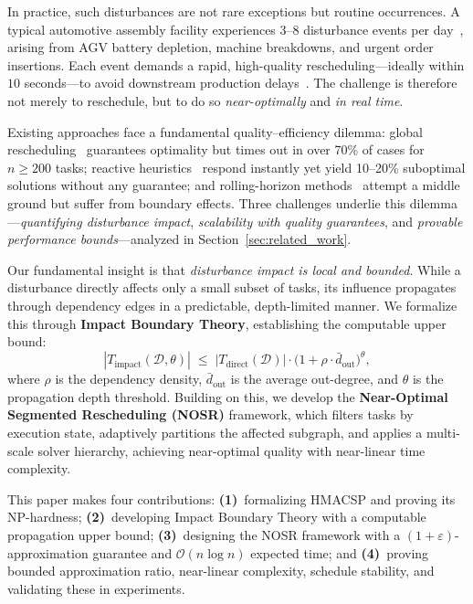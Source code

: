 \documentclass[manuscript,screen,review]{acmart}
\begin{document}
In practice, such disturbances are not rare exceptions but routine occurrences. A
typical automotive assembly facility experiences 3--8 disturbance events per day~\cite{shah2017plant},
arising from AGV battery depletion, machine breakdowns, and urgent order insertions.
Each event demands a rapid, high-quality rescheduling---ideally within $10$ seconds---to avoid downstream production delays~\cite{john2020integration}. The challenge is therefore not merely to reschedule,
but to do so \textit{near-optimally} and \textit{in real time}.


Existing approaches face a fundamental quality--efficiency dilemma:
global rescheduling~\cite{zhang2017flexible} guarantees optimality but
times out in over 70\% of cases for $n \geq 200$ tasks; reactive
heuristics~\cite{dalcastagne2020reactive} respond instantly yet yield
10--20\% suboptimal solutions without any guarantee; and
rolling-horizon methods~\cite{zeitrag2025novel}
attempt a middle ground but suffer from boundary effects.
Three challenges underlie this dilemma---\textit{quantifying
disturbance impact}, \textit{scalability with quality guarantees},
and \textit{provable performance bounds}---analyzed in
Section~\ref{sec:related_work}.

Our fundamental insight is that \textit{disturbance impact is local and bounded}.
While a disturbance directly affects only a small subset of tasks, its influence
propagates through dependency edges in a predictable, depth-limited manner. We
formalize this through \textbf{Impact Boundary Theory}, establishing the computable
upper bound:
\begin{equation}
    |T_{\mathrm{impact}}(\mathcal{D}, \theta)| \;\leq\;
    |T_{\mathrm{direct}}(\mathcal{D})| \cdot
    \bigl(1 + \rho \cdot \bar{d}_{\mathrm{out}}\bigr)^{\theta},
    \label{eq:impact_bound_intro}
\end{equation}
where $\rho$ is the dependency density, $\bar{d}_{\mathrm{out}}$ is the average
out-degree, and $\theta$ is the propagation depth threshold. Building on this, we
develop the \textbf{Near-Optimal Segmented Rescheduling (NOSR)} framework, which
filters tasks by execution state, adaptively partitions the affected subgraph, and
applies a multi-scale solver hierarchy, achieving
near-optimal quality with near-linear time complexity.

This paper makes four contributions: \textbf{(1)}~formalizing HMACSP and proving
its NP-hardness; \textbf{(2)}~developing Impact Boundary
Theory with a computable propagation upper bound; \textbf{(3)}~designing the NOSR
framework with a $(1+\varepsilon)$-approximation guarantee and
$\mathcal{O}(n \log n)$ expected time; and \textbf{(4)}~proving bounded
approximation ratio, near-linear complexity, schedule stability, and validating these in experiments.
\end{document}
